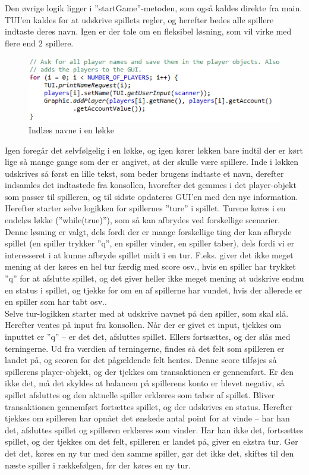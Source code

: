 Den øvrige logik ligger i ”startGame”-metoden, som også kaldes direkte fra main.
TUI’en kaldes for at udskrive spillets regler, og herefter bedes alle spillere indtaste deres navn. Igen er der tale om en fleksibel løsning, som vil virke med flere end 2 spillere.
\begin{figure}[!ht]
\centering
\includegraphics[scale=0.4]{Game-illustration2.jpg}
\caption[<Text for the list of figures>]{Indlæs navne i en løkke}
\label{fig:figure 2} 
\end{figure}
Igen foregår det selvfølgelig i en løkke, og igen kører løkken bare indtil der er kørt lige så mange gange som der er angivet, at der skulle være spillere.
Inde i løkken udskrives så først en lille tekst, som beder brugens indtaste et navn, derefter indsamles det indtastede fra konsollen, hvorefter det gemmes i det player-objekt som passer til spilleren, og til sidste opdateres GUI’en med den nye information.
\\

Herefter starter selve logikken for spillernes ”ture” i spillet. Turene køres i en endeløs løkke (”while(true)”), som så kan afbrydes ved forskellige scenarier. Denne løsning er valgt, dels fordi der er mange forskellige ting der kan afbryde spillet (en spiller trykker ”q”, en spiller vinder, en spiller taber), dels fordi vi er interesseret i at kunne afbryde spillet midt i en tur. F.eks. giver det ikke meget mening at der køres en hel tur færdig med score osv., hvis en spiller har trykket ”q” for at afslutte spillet, og det giver heller ikke meget mening at udskrive endnu en status i spillet, og tjekke for om en af spillerne har vundet, hvis der allerede er en spiller som har tabt osv..
\\

Selve tur-logikken starter med at udskrive navnet på den spiller, som skal slå. Herefter ventes på input fra konsollen. Når der er givet et input, tjekkes om inputtet er ”q” – er det det, afsluttes spillet. Ellers fortsættes, og der slås med terningerne. Ud fra værdien af terningerne, findes så det felt som spilleren er landet på, og scoren for det pågældende felt hentes. Denne score tilføjes så spillerens player-objekt, og der tjekkes om transaktionen er gennemført. Er den ikke det, må det skyldes at balancen på spillerens konto er blevet negativ, så spillet afsluttes og den aktuelle spiller erklæres som taber af spillet. Bliver transaktionen gennemført fortættes spillet, og der udskrives en status. Herefter tjekkes om spilleren har opnået det ønskede antal point for at vinde – har han det, afsluttes spillet og spilleren erklæres som vinder. Har han ikke det, fortsættes spillet, og der tjekkes om det felt, spilleren er landet på, giver en ekstra tur. Gør det det, køres en ny tur med den samme spiller, gør det ikke det, skiftes til den næste spiller i rækkefølgen, før der køres en ny tur.
\\

